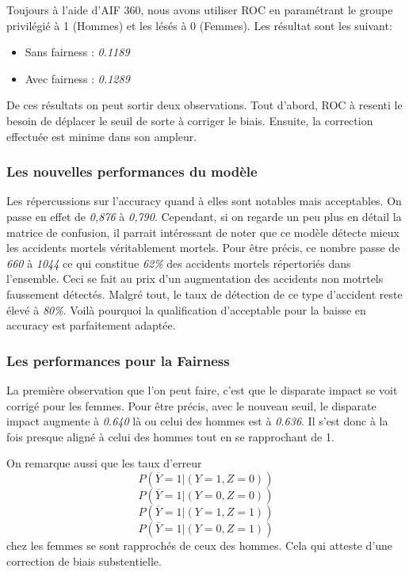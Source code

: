 \documentclass{article}
\begin{document}
    Toujours à l'aide d'AIF 360, nous avons utiliser ROC en paramétrant le groupe privilégié à 1 (Hommes) et les lésés à 0 (Femmes).
    Les résultat sont les suivant: 

    \begin{itemize}
        \item Sans fairness : \textit{0.1189}
        \item Avec fairness : \textit{0.1289}
    \end{itemize}
    
    De ces résultats on peut sortir deux observations. Tout d'abord, ROC à resenti le besoin de déplacer le seuil de sorte à corriger 
    le biais. Ensuite, la correction effectuée est minime dans son ampleur. 

    \subsubsection{Les nouvelles performances du modèle}

    Les répercussions sur l'accuracy quand à elles sont notables mais acceptables. On passe en effet de \textit{0,876} à \textit{0,790}.
    Cependant, si on regarde un peu plus en détail la matrice de confusion, il parrait intéressant de noter que ce modèle détecte mieux 
    les accidents mortels véritablement mortels. Pour être précis, ce nombre passe de \textit{660} à \textit{1044} ce qui constitue  \textit{62\%} des accidents
    mortels répertoriés dans l'ensemble. Ceci se fait au prix d'un augmentation des accidents non motrtels faussement détectés. Malgré tout, 
    le taux de détection de ce type d'accident reste élevé à \textit{80\%}. Voilà pourquoi la qualification d'acceptable pour la baisse en 
    accuracy est parfaitement adaptée.

    \subsubsection{Les performances pour la Fairness}

    La première observation que l'on peut faire, c'est que le disparate impact se voit corrigé pour les femmes. Pour être précis, avec le nouveau seuil, le disparate impact
    augmente à \textit{0.640} là ou celui des hommes est à \textit{0.636}. Il s'est donc à la fois presque aligné à celui des hommes tout en se rapprochant de 1. 
    
    On remarque aussi que les taux d'erreur 
    \[ P(\overline{Y}=1| (Y=1, Z=0)) \] \[ P(\overline{Y}=1| (Y=0, Z=0)) \] \[ P(\overline{Y}=1| (Y=1, Z=1)) \] \[ P(\overline{Y}=1| (Y=0, Z=1)) \] chez les femmes se sont rapprochés de
    ceux des hommes. Cela qui atteste d'une correction de biais substentielle.  
\end{document}
